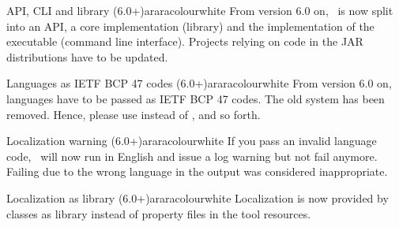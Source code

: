 \begin{messagebox}{{API, CLI} and library (6.0+)}{araracolour}{\icinfo}{white}
From version 6.0 on, \arara\ is now split into an API, a core implementation (library) and the implementation of the executable (command line interface). Projects relying on code in the  JAR distributions have to be updated.
\end{messagebox}

\begin{messagebox}{Languages as IETF BCP 47 codes (6.0+)}{araracolour}{\icinfo}{white}
From version 6.0 on, languages have to be passed as IETF BCP 47 codes. The old system has been
  removed. Hence, please use  instead of , and so forth.
\end{messagebox}

\begin{messagebox}{Localization warning (6.0+)}{araracolour}{\icinfo}{white}
If you pass an invalid language code, \arara\ will now run in English and issue a log warning but not fail anymore. Failing due to the wrong language in the output was considered inappropriate.
\end{messagebox}

\begin{messagebox}{Localization as library (6.0+)}{araracolour}{\icinfo}{white}
Localization is now provided by classes as library instead of property files in the tool resources.
\end{messagebox}

